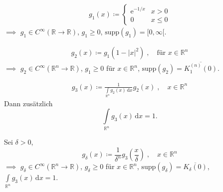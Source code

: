 \documentclass[a4paper,10pt]{scrbook}
\begin{document}
\begin{theorem}[Satz] \label{thm:10.4}
  \begin{enum-arab}
    \item
    \begin{align*}
      g_1(x) \coloneq
      \begin{cases}
        \mathrm{e}^{-1/x} & x > 0 \\
        0 & x \leq 0
      \end{cases}
    \end{align*}
    $\implies$ $g_1 \in C^\infty(\mathbb{R} \to \mathbb{R})$, $g_1 \geq 0$, $\mathrm{supp}(g_1) = [0,\infty[$.

    \item
    \begin{align*}
      g_2(x) \coloneq g_1(1-|x|^2) \; , \quad  \text{für $x \in \mathbb{R}^n$}
    \end{align*}
    $\implies$ $g_2 \in C^\infty(\mathbb{R}^n \to \mathbb{R})$, $g_1 \geq 0$ für $x \in \mathbb{R}^n$, $\mathrm{supp}(g_2) = \overline{K_1^{(n)}(0)}$.

    \item
    \begin{align*}
      g_3(x) \coloneq \frac{1}{\int\limits_{\mathbb{R}^n} g_2(x) \, \mathrm{d}x} g_2(x) \; , \quad x \in \mathbb{R}^n
    \end{align*}
    Dann zusätzlich \[ \int\limits_{\mathbb{R}^n} g_3(x) \, \mathrm{d}x = 1. \]

    \item Sei $\delta > 0$, \[ g_\delta(x) \coloneq \frac{1}{\delta^n} g_3\left( \frac{x}{\delta} \right) \; , \quad x \in \mathbb{R}^n \]
    $\implies$ $g_\delta \in C^\infty(\mathbb{R}^n \to \mathbb{R})$, $g_\delta \geq 0$ für $x \in \mathbb{R}^n$, $\mathrm{supp}(g_\delta) = \overline{K_\delta(0)}$, $\displaystyle \int\limits_{\mathbb{R}^n} g_3(x) \, \mathrm{d}x = 1$.
  \end{enum-arab}
\end{theorem}
\end{document}
